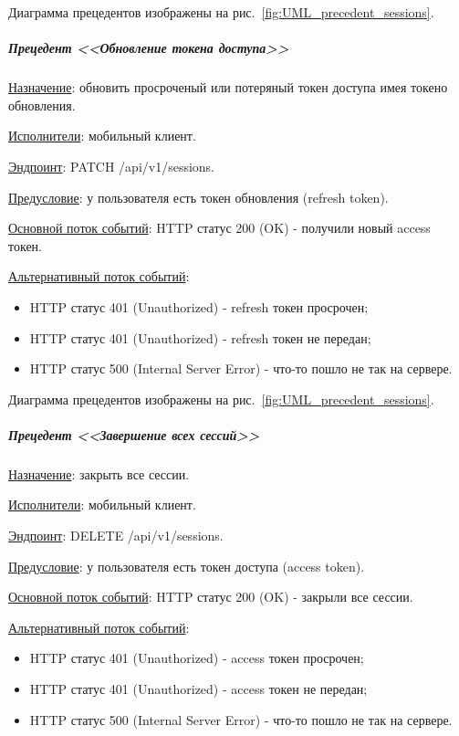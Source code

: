 Диаграмма прецедентов изображены на рис.~\ref{fig:UML_precedent_sessions}.


\subparagraph{Прецедент <<Обновление токена доступа>>} \hspace{0pt}

\underline{Назначение}: обновить просроченый или потеряный токен доступа имея токено обновления.

\underline{Исполнители}: мобильный клиент.

\underline{Эндпоинт}: PATCH /api/v1/sessions.

\underline{Предусловие}: у пользователя есть токен обновления (refresh token).

\underline{Основной поток событий}: HTTP статус 200 (OK) - получили новый access токен. 

\underline{Альтернативный поток событий}:

\begin{itemize}
    \item HTTP статус 401 (Unauthorized) - refresh токен просрочен;
    \item HTTP статус 401 (Unauthorized) - refresh токен не передан;
    \item HTTP статус 500 (Internal Server Error) - что-то пошло не так на сервере.
\end{itemize}

Диаграмма прецедентов изображены на рис.~\ref{fig:UML_precedent_sessions}.


\subparagraph{Прецедент <<Завершение всех сессий>>} \hspace{0pt}

\underline{Назначение}: закрыть все сессии.

\underline{Исполнители}: мобильный клиент.

\underline{Эндпоинт}: DELETE /api/v1/sessions.

\underline{Предусловие}: у пользователя есть токен доступа (access token).

\underline{Основной поток событий}: HTTP статус 200 (OK) - закрыли все сессии. 

\underline{Альтернативный поток событий}:

\begin{itemize}
    \item HTTP статус 401 (Unauthorized) - access токен просрочен;
    \item HTTP статус 401 (Unauthorized) - access токен не передан;
    \item HTTP статус 500 (Internal Server Error) - что-то пошло не так на сервере.
\end{itemize}

